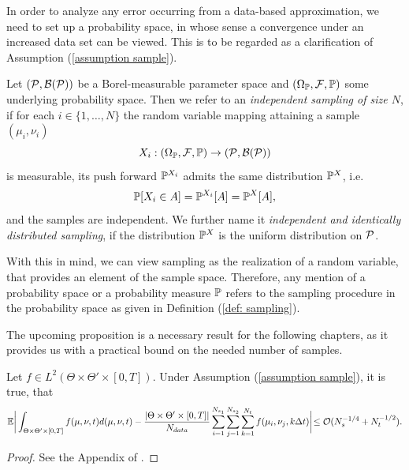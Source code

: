 In order to analyze any error occurring from a data-based approximation, we need to set up a probability space, in whose
sense a convergence under an increased data set can be viewed. This is to be regarded as a clarification of 
Assumption (\ref{assumption sample}).
\begin{definition}[Sampling] \label{def: sampling}
    Let $(\mathcal{P}, \mathcal{B}(\mathcal{P}))$ be a Borel-measurable parameter space and
    $(\Omega_{\mathbb{P}}, \mathcal{F}, \mathbb{P})$ some underlying probability space. Then we refer to an 
    \emph{independent sampling of size $N$}, if for each $i \in  \{1, \dots, N\}$ the
    random variable mapping attaining a sample $(\mu_i, \nu_i)$
    \begin{equation*}
        X_i:(\Omega_{\mathbb{P}}, \mathcal{F}, \mathbb{P}) \to (\mathcal{P}, \mathcal{B}(\mathcal{P}))
    \end{equation*}
    is measurable, its push forward $\mathbb{P}^{X_i}$ admits the same distribution $\mathbb{P}^X$, i.e.
    \begin{equation*}
        \mathbb{P}[X_i \in A] = \mathbb{P}^{X_i}[A] = \mathbb{P}^X[A],
    \end{equation*}
    and the samples are independent. We further name it \emph{independent and identically distributed sampling}, 
    if the distribution $\mathbb{P}^X$
    is the uniform distribution
    on $\mathcal{P}$.
\end{definition}

With this in mind, we can view sampling as the realization of a random variable, that provides an element of the sample
space. Therefore, any mention of a probability space or a probability measure $\mathbb{P}$ refers to the sampling procedure in the probability space
as given in Definition (\ref{def: sampling}). 

The upcoming proposition is a necessary result for the following chapters, as it provides us with a practical
bound on the needed number of samples.

\begin{proposition} \label{prop: order of convergence for sample}
    Let $f \in L^2(\Theta \times \Theta' \times [0, T])$. 
    Under Assumption (\ref{assumption sample}), it is true, that
    \begin{equation*}
        \mathbb{E}\bigg\vert \int_{\Theta \times \Theta' \times [0, T]} f(\mu, \nu, t) d(\mu, \nu, t) 
        - \frac{\vert \Theta \times \Theta' \times [0, T] \vert}{N_{data}} 
        \sum_{i = 1}^{N_{s_1}} \sum_{j = 1}^{N_{s_2}} \sum_{k = 1}^{N_t} f(\mu_i, \nu_j, k \Delta t) \bigg\vert
        \! \leq \mathcal{O}(N_s^{-1/4} + N_t^{-1/2}).
    \end{equation*}
\end{proposition}
\begin{proof}
    See the Appendix of \cite{brivio2023}.
\end{proof}




